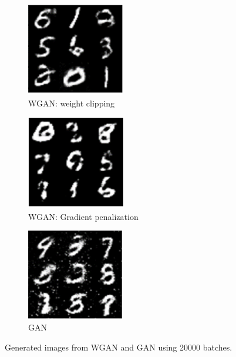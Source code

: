 \documentclass[a4paper,10pt]{article}
\begin{document}
\begin{figure}[ht]
	\begin{subfigure}{0.32\textwidth}
		\centering
		\includegraphics[width=0.5\linewidth]{WGAN2.png}
		\caption{WGAN: weight clipping}
		\label{fig:WGAN2}
	\end{subfigure}	 	
	\begin{subfigure}{0.32\textwidth}
		\centering
		\includegraphics[width=0.5\linewidth]{WGAN1.png}
		\caption{WGAN: Gradient penalization}
		\label{fig:WGAN1}
	\end{subfigure}	
	\begin{subfigure}{0.32\textwidth}
		\centering
		\includegraphics[width=0.5\linewidth]{GAN.png}
		\caption{GAN}
		\label{fig:GAN}
	\end{subfigure}
	\caption{Generated images from WGAN and GAN using 20000 batches.}
	\label{fig:WGAN_compare}
\end{figure}
\end{document}
